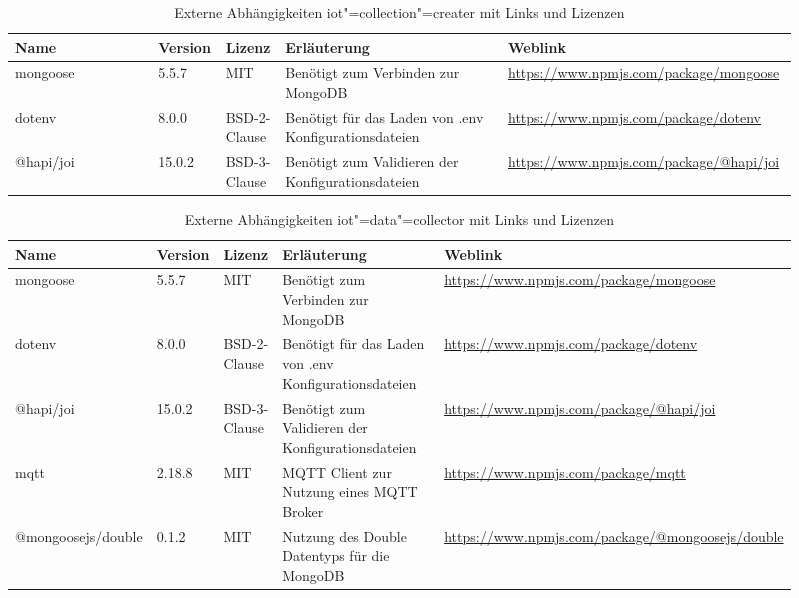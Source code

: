 \begin{landscape}
\begin{table}[htb]
	\caption{Externe Abhängigkeiten iot"=collection"=creater mit Links und Lizenzen}
	\begin{tabular}{|p{0.18\linewidth}|p{0.06\linewidth}|p{0.06\linewidth}|p{0.28\linewidth}|p{0.33\linewidth}|}
		\hline
		Name & Version & Lizenz & Erläuterung & Weblink \\ \hline
		mongoose & 5.5.7 & MIT & Benötigt zum Verbinden zur MongoDB & \small\url{https://www.npmjs.com/package/mongoose} \\ \hline
		dotenv & 8.0.0 & BSD-2-Clause & Benötigt für das Laden von .env Konfigurationsdateien & \small\url{https://www.npmjs.com/package/dotenv} \\ \hline
		@hapi/joi & 15.0.2 & BSD-3-Clause & Benötigt zum Validieren der Konfigurationsdateien & \small\url{https://www.npmjs.com/package/@hapi/joi} \\ \hline
	\end{tabular}
	\label{tbl:dependenciesCollectionCreater}
\end{table}

\begin{table}[htb]
	\caption{Externe Abhängigkeiten iot"=data"=collector mit Links und Lizenzen}
	\begin{tabular}{|p{0.18\linewidth}|p{0.06\linewidth}|p{0.06\linewidth}|p{0.28\linewidth}|p{0.33\linewidth}|}
		\hline
		Name & Version & Lizenz & Erläuterung & Weblink \\ \hline
		mongoose & 5.5.7 & MIT & Benötigt zum Verbinden zur MongoDB & \small\url{https://www.npmjs.com/package/mongoose} \\ \hline
		dotenv & 8.0.0 & BSD-2-Clause & Benötigt für das Laden von .env Konfigurationsdateien & \small\url{https://www.npmjs.com/package/dotenv} \\ \hline
		@hapi/joi & 15.0.2 & BSD-3-Clause & Benötigt zum Validieren der Konfigurationsdateien & \small\url{https://www.npmjs.com/package/@hapi/joi} \\ \hline
		mqtt & 2.18.8 & MIT & MQTT Client zur Nutzung eines MQTT Broker & \small\url{https://www.npmjs.com/package/mqtt} \\ \hline
		@mongoosejs/double & 0.1.2 & MIT & Nutzung des Double Datentyps für die MongoDB & \small\url{https://www.npmjs.com/package/@mongoosejs/double} \\ \hline
	\end{tabular}
	\label{tbl:dependenciesDataCollector}
\end{table}


\end{landscape}
